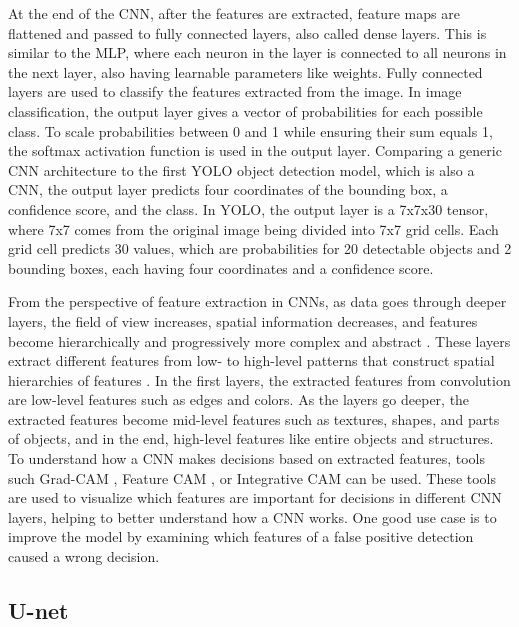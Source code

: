 At the end of the CNN, after the features are extracted, feature maps are flattened and passed to fully connected layers, also called dense layers. This is similar to the MLP, where each neuron in the layer is connected to all neurons in the next layer, also having learnable parameters like weights. Fully connected layers are used to classify the features extracted from the image. In image classification, the output layer gives a vector of probabilities for each possible class. To scale probabilities between 0 and 1 while ensuring their sum equals 1, the softmax activation function is used in the output layer. \cite{CNNradiology}
Comparing a generic CNN architecture to the first YOLO object detection model, which is also a CNN, the output layer predicts four coordinates of the bounding box, a confidence score, and the class. In YOLO, the output layer is a 7x7x30 tensor, where 7x7 comes from the original image being divided into 7x7 grid cells. Each grid cell predicts 30 values, which are probabilities for 20 detectable objects and 2 bounding boxes, each having four coordinates and a confidence score. \cite{redmon2016lookonceunifiedrealtime}

From the perspective of feature extraction in CNNs, as data goes through deeper layers, the field of view increases, spatial information decreases, and features become hierarchically and progressively more complex and abstract \cite{CNNradiology, soleymani2018multilevelfeatureabstractionconvolutional}. These layers extract different features from low- to high-level patterns that construct spatial hierarchies of features \cite{CNNradiology}. In the first layers, the extracted features from convolution are low-level features such as edges and colors. As the layers go deeper, the extracted features become mid-level features such as textures, shapes, and parts of objects, and in the end, high-level features like entire objects and structures. \cite{zeiler2013visualizingunderstandingconvolutionalnetworks} To understand how a CNN makes decisions based on extracted features, tools such Grad-CAM \cite{Selvaraju_2019}, Feature CAM \cite{clement2024featurecaminterpretableai}, or Integrative CAM \cite{singh2024integrativecamadaptivelayer} can be used. These tools are used to visualize which features are important for decisions in different CNN layers, helping to better understand how a CNN works. One good use case is to improve the model by examining which features of a false positive detection caused a wrong decision.

\subsection{U-net}

